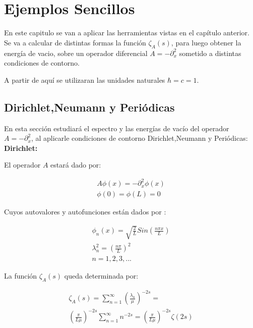 \chapter{Ejemplos Sencillos}
    
En este capitulo se van a aplicar las herramientas vistas en el capítulo anterior. Se va a calcular de distintas formas la función $ \zeta _A (s) $, para luego obtener la energía de vacio, sobre un operador diferencial $A = - \partial ^2 _x$ sometido a distintas condiciones de contorno.
    
A partir de aquí se utilizaran las unidades naturales $\hbar=c=1$.

\section{Dirichlet,Neumann y Periódicas}

En esta sección estudiará el espectro y las energías de vacío del operador $A = - \partial ^2 _x$, al aplicarle condiciones de contorno Dirichlet,Neumann y Periódicas: \\

\textbf{Dirichlet:}

El operador $A$ estará dado por:

\begin{equation}
\begin{array}{c}
	A \phi (x) = - \partial _x ^2 \phi (x) \\
    \phi (0) = \phi(L) = 0 
\end{array}
\end{equation}


Cuyos autovalores y autofunciones están dados por  : 

\begin{equation}
\begin{array}{c}
	\phi _n (x) = \sqrt{\frac{2}{L}} Sin( \frac{n \pi x}{L} ) \\
	\lambda _n ^2 = \left( \frac{n \pi }{L} \right) ^2 \\
	n = 1,2,3, ...
\end{array}
\end{equation}

La función $\zeta _A (s)$ queda determinada por:

\begin{equation}
\begin{array}{c}
\zeta _A (s) = 
\sum _{n=1} ^{\infty} \left( \frac{\lambda _n}{\mu} \right) ^{-2s} =  \\
\left(  \frac{\pi}{L \mu} \right) ^{-2s}   \sum _{n=1} ^{\infty} n ^{-2s} = 
\left( \frac{\pi}{L \mu} \right) ^{-2s}  \zeta (2s)
\end{array}
\end{equation}

